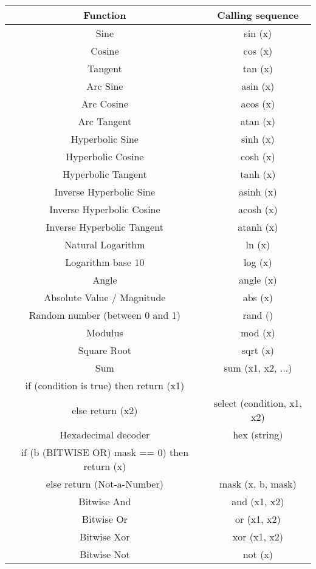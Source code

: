\begin{tabular}{|c|c|}
\hline 
Function &Calling sequence \\
 \hline 
Sine &sin (x) \\
 \hline 
Cosine &cos (x) \\
 \hline 
Tangent &tan (x) \\
 \hline 
Arc Sine &asin (x) \\
 \hline 
Arc Cosine &acos (x) \\
 \hline 
Arc Tangent &atan (x) \\
 \hline 
Hyperbolic Sine &sinh (x) \\
 \hline 
Hyperbolic Cosine &cosh (x) \\
 \hline 
Hyperbolic Tangent &tanh (x) \\
 \hline 
Inverse Hyperbolic Sine &asinh (x) \\
 \hline 
Inverse Hyperbolic Cosine &acosh (x) \\
 \hline 
Inverse Hyperbolic Tangent &atanh (x) \\
 \hline 
Natural Logarithm &ln (x) \\
 \hline 
Logarithm base 10 &log (x) \\
 \hline 
Angle &angle (x) \\
 \hline 
Absolute Value / Magnitude &abs (x) \\
 \hline 
Random number (between 0 and 1) &rand () \\
 \hline 
Modulus &mod (x) \\
 \hline 
Square Root &sqrt (x) \\
 \hline 
Sum &sum (x1, x2, ...) \\
 \hline 
if (condition is true) then return (x1)\\ 
 else return (x2) &select (condition, x1, x2) \\
 \hline 
Hexadecimal decoder &hex (string) \\
 \hline 
if (b (BITWISE OR) mask == 0) then return (x)\\ 
 else return (Not-a-Number) &mask (x, b, mask) \\
 \hline 
Bitwise And &and (x1, x2) \\
 \hline 
Bitwise Or &or (x1, x2) \\
 \hline 
Bitwise Xor &xor (x1, x2) \\
 \hline 
Bitwise Not &not (x) \\
 \hline 

\end{tabular}





